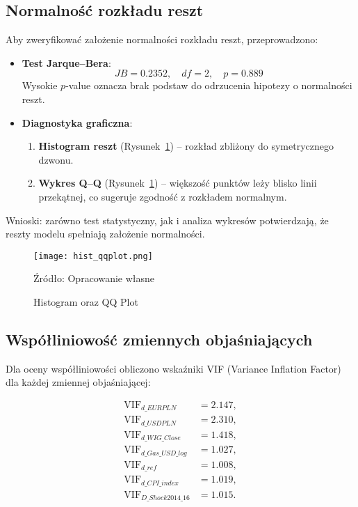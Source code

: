 \documentclass[12pt, twoside]{article}
\begin{document}
\subsection*{Normalność rozkładu reszt}


Aby zweryfikować założenie normalności rozkładu reszt, przeprowadzono:

\begin{itemize}
  \item \textbf{Test Jarque–Bera}:
    \[
      JB = 0.2352,\quad df = 2,\quad p = 0.889
    \]
    Wysokie \(p\)-value oznacza brak podstaw do odrzucenia hipotezy o normalności reszt.

  \item \textbf{Diagnostyka graficzna}:
    \begin{enumerate}
      \item \textbf{Histogram reszt} (Rysunek~\ref{fig:hist_QQ}) – rozkład zbliżony do symetrycznego dzwonu.
      \item \textbf{Wykres Q–Q} (Rysunek~\ref{fig:hist_QQ}) – większość punktów leży blisko linii przekątnej, co sugeruje zgodność z rozkładem normalnym.
    \end{enumerate}
\end{itemize}

\noindent
Wnioski: zarówno test statystyczny, jak i analiza wykresów potwierdzają, że reszty modelu spełniają założenie normalności.

\begin{figure}[H]
    \centering
    \texttt{[image: hist\_qqplot.png]}
    \caption{Histogram oraz QQ Plot}
    \label{fig:hist_QQ}
    \vspace{0.1cm}
    {\parbox[t]{\linewidth}{\raggedright Źródło: Opracowanie własne}}

\end{figure}


\subsection*{Współliniowość zmiennych objaśniających}
\label{sec:wspolliniowosc}

Dla oceny współliniowości obliczono wskaźniki VIF (Variance Inflation Factor) dla każdej zmiennej objaśniającej:

\[
\begin{aligned}
  \mathrm{VIF}_{d\_EURPLN} &= 2.147, \\
  \mathrm{VIF}_{d\_USDPLN} &= 2.310, \\
  \mathrm{VIF}_{d\_WIG\_Close} &= 1.418, \\
  \mathrm{VIF}_{d\_Gas\_USD\_log} &= 1.027, \\
  \mathrm{VIF}_{d\_ref} &= 1.008, \\
  \mathrm{VIF}_{d\_CPI\_index} &= 1.019, \\
  \mathrm{VIF}_{D\_Shock2014\_16} &= 1.015.
\end{aligned}
\]
\end{document}
